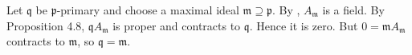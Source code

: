 Let $\mathfrak{q}$ be $\mathfrak{p}$-primary and choose a maximal ideal $\mathfrak{m}\supseteq\mathfrak{p}$. By , $A_{\mathfrak{m}}$ is a field. By Proposition 4.8, $\mathfrak{q}A_{\mathfrak{m}}$ is proper and contracts to $\mathfrak{q}$. Hence it is zero. But $0=\mathfrak{m}A_{\mathfrak{m}}$ contracts to $\mathfrak{m}$, so $\mathfrak{q}=\mathfrak{m}$.

